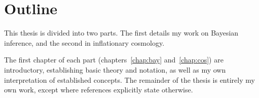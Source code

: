 \chapter{Outline}
\label{chap:out}

This thesis is divided into two parts. The first details my work on Bayesian inference, and the second in inflationary cosmology.

The first chapter of each part (chapters~\ref{chap:bay} and~\ref{chap:cos}) are introductory, establishing basic theory and notation, as well as my own interpretation of established concepts. The remainder of the thesis is entirely my own work, except where references explicitly state otherwise.
